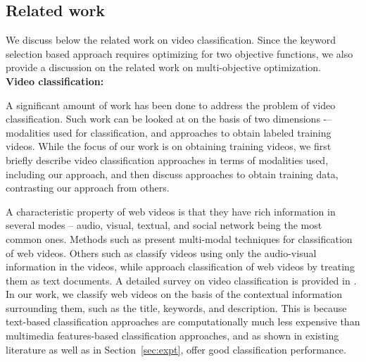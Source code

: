 \subsection{Related work} 
\label{sec:relatedwork}
We discuss below the related work on video classification. Since the keyword selection based approach requires optimizing for two objective functions, we also provide a discussion on the related work on multi-objective optimization. \\

\noindent \textbf{Video classification: }

A significant amount of work has been done to address the problem of video classification. Such work can be looked at on the basis of two dimensions -– modalities used for classification, and approaches to obtain labeled training videos.  While the focus of our work is on obtaining training videos, we first briefly describe video classification approaches in terms of modalities used, including our approach, and then discuss approaches to obtain training data, contrasting our approach from others. 

A characteristic property of web videos is that they have rich information in several modes -- audio, visual, textual, and social network being the most common ones. Methods such as \cite{song2010taxonomic,wang2010youtubecat,zhang2011improving,ramachandran2009videomule,yang2007multi} present multi-modal techniques for classification of web videos. Others such as \cite{schindler2008internet,chen2010effective} classify videos using only the audio-visual information in the videos, while \cite{chen2010web,wu2010data} approach classification of web videos by treating them as text documents. A detailed survey on video classification is provided in \cite{brezeale2008automatic}. In our work, we classify web videos on the basis of the contextual information surrounding them, such as the title, keywords, and description. This is because text-based classification approaches are computationally much less expensive than multimedia features-based classification approaches, and as shown in existing literature as well as in Section~\ref{sec:expt}, offer good classification performance.  

